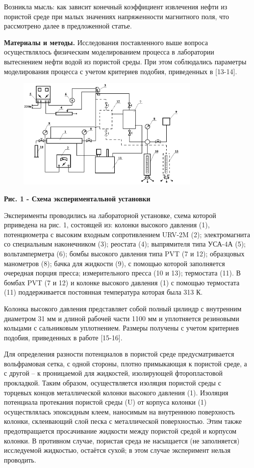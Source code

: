 {{Возникла мысль: как зависит конечный коэффициент извлечения нефти из
пористой среде при малых значениях напряженности магнитного поля, что
рассмотрено далее в предложенной статье.

{\bfseries Материалы и методы.} Исследования поставленного выше вопроса
осуществлялось физическим моделированием процесса в лаборатории
вытеснением нефти водой из пористой среды. При этом соблюдались
параметры моделирования процесса с учетом критериев подобия, приведенных
в {[}13-14{]}.

\begin{figure}[H]
	\centering
	\includegraphics[width=0.8\textwidth]{media/gorn4/image2}
	\caption*{}
\end{figure}


{\bfseries Рис. 1 - Схема экспериментальной установки}

Эксперименты проводились на лабораторной установке, схема которой
рприведена на рис. 1, состоящей из: колонки высокого давления (1),
потенциометра с высоким входным сопротивлением URV-2M (2);
электромагнита со специальным наконечником (3); реостата (4);
выпрямителя типа УСА-4А (5); вольтамперметра (6); бомбы высокого
давления типа PVT (7 и 12); образцовых манометров (8); бачка для
жидкости (9), с помощью которой заполняется очередная порция пресса;
измерительного пресса (10 и 13); термостата (11). В бомбах PVT (7 и 12)
и колонке высокого давления (1) с помощью термостата (11) поддерживается
постоянная температура которая была 313 К.

Колонка высокого давления представляет собой полный цилиндр с внутренним
диаметром 31 мм и длиной рабочей части 1100 мм и уплотняется резиновыми
кольцами с сальниковым уплотнением. Размеры получены с учетом критериев
подобия, приведенных в работе {[}15-16{]}.

Для определения разности потенциалов в пористой среде предусматривается
вольфрамовая сетка, с одной стороны, плотно примыкающая к пористой
среде, а с другой -- к проницаемой для жидкостей, изолирующей
фторопластовой прокладкой. Таким образом, осуществляется изоляция
пористой среды с торцевых концов металлической колонки высокого давления
(1). Изоляция потенциала протекания пористой среды (U) от корпуса
колонки (1) осуществлялась эпоксидным клеем, наносимым на внутреннюю
поверхность колонки, склеивающий слой песка с металлической
поверхностью. Этим также предотвращается просачивание жидкости между
пористой средой и корпусом колонки. В противном случае, пористая среда
не насыщается (не заполняется) исследуемой жидкостью, остаётся сухой; в
этом случае эксперимент нельзя проводить.

}}
